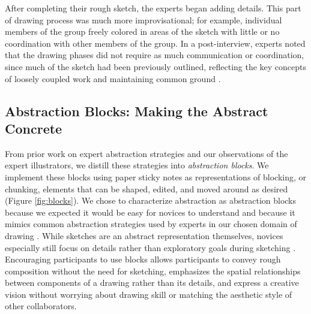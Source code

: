 After completing their rough sketch, the experts began adding details. This part of drawing process was much more improvisational; for example, individual members of the group freely colored in areas of the sketch with little or no coordination with other members of the group. In a post-interview, experts noted that the drawing phases did not require as much communication or coordination, since much of the sketch had been previously outlined, reflecting the key concepts of loosely coupled work and maintaining common ground \cite{olson2000distance}.

\subsection{Abstraction Blocks: Making the Abstract Concrete}
From prior work on expert abstraction strategies and our observations of the expert illustrators, we distill these strategies into \textit{abstraction blocks}. We implement these blocks using paper sticky notes as representations of blocking, or chunking, elements that can be shaped, edited, and moved around as desired (Figure \ref{fig:blocks}). We chose to characterize abstraction as abstraction blocks because we expected it would be easy for novices to understand and because it mimics common abstraction strategies used by experts in our chosen domain of drawing \cite{poore1967composition}. While sketches are an abstract representation themselves, novices especially still focus on details rather than exploratory goals during sketching \cite{welch2000sketching}. Encouraging participants to use blocks allows participants to convey rough composition without the need for sketching, emphasizes the spatial relationships between components of a drawing rather than its details, and express a creative vision without worrying about drawing skill or matching the aesthetic style of other collaborators.

